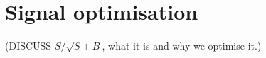 \documentclass[12pt]{thesis}  %
\begin{document}

\chapter{Signal optimisation}

(DISCUSS $S/\sqrt{S+B}$, what it is and why we optimise it.)
\end{document}
